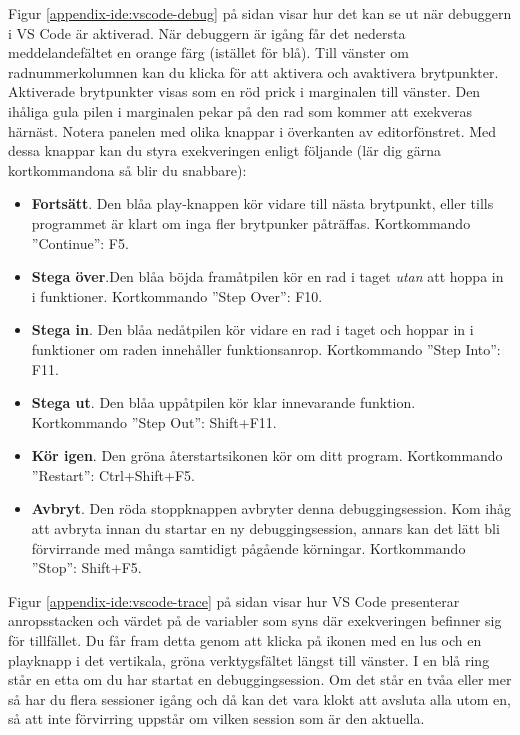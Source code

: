 Figur \ref{appendix-ide:vscode-debug} på sidan \pageref{appendix-ide:vscode-debug} visar hur det kan se ut när debuggern i VS Code är aktiverad. När debuggern är igång får det nedersta meddelandefältet en orange färg (istället för blå). Till vänster om radnummerkolumnen kan du klicka för att aktivera och avaktivera brytpunkter. Aktiverade brytpunkter visas som en röd prick i marginalen till vänster. Den ihåliga gula pilen i marginalen pekar på den rad som kommer att exekveras härnäst. Notera panelen med olika knappar i överkanten av editorfönstret. Med dessa knappar kan du styra exekveringen enligt följande (lär dig gärna kortkommandona så blir du snabbare):
\begin{itemize}
  \item \textbf{Fortsätt}. Den blåa play-knappen kör vidare till nästa brytpunkt, eller tills programmet är klart om inga fler brytpunker påträffas. Kortkommando ''Continue'': F5.
  \item \textbf{Stega över}.Den blåa böjda framåtpilen kör en rad i taget \emph{utan} att hoppa in i funktioner.  Kortkommando ''Step Over'': F10.
  \item \textbf{Stega in}. Den blåa nedåtpilen kör vidare en rad i taget och hoppar in i funktioner om raden innehåller funktionsanrop. Kortkommando ''Step Into'': F11.
  \item \textbf{Stega ut}. Den blåa uppåtpilen kör klar innevarande funktion. Kortkommando ''Step Out'': Shift+F11.
  \item \textbf{Kör igen}. Den gröna återstartsikonen kör om ditt program. Kortkommando ''Restart'': Ctrl+Shift+F5.
  \item \textbf{Avbryt}. Den röda stoppknappen avbryter denna debuggingsession. Kom ihåg att avbryta innan du startar en ny debuggingsession, annars kan det lätt bli förvirrande med många samtidigt pågående körningar. Kortkommando ''Stop'': Shift+F5. 
\end{itemize}

Figur \ref{appendix-ide:vscode-trace} på sidan \pageref{appendix-ide:vscode-trace} visar hur VS Code presenterar anropsstacken och värdet på de variabler som syns där exekveringen befinner sig för tillfället. Du får fram detta genom att klicka på ikonen med en lus och en playknapp i det vertikala, gröna verktygsfältet längst till vänster. I en blå ring står en etta om du har startat en debuggingsession. Om det står en tvåa eller mer så har du flera sessioner igång och då kan det vara klokt att avsluta alla utom en, så att inte förvirring uppstår om vilken session som är den aktuella. 

